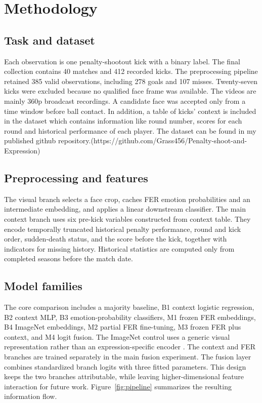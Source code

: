 \documentclass{article}
\begin{document}
\section{Methodology}

\subsection{Task and dataset}

Each observation is one penalty-shootout kick with a binary label. The final collection contains 40 matches and 412 recorded kicks. The preprocessing pipeline retained 385 valid observations, including 278 goals and 107 misses. Twenty-seven kicks were excluded because no qualified face frame was available. The videos are mainly 360p broadcast recordings. A candidate face was accepted only from a time window before ball contact. In addition, a table of kicks' context is included in the dataset which contains information like round number, scores for each round and historical performance of each player. The dataset can be found in my published github repository.(https://github.com/Grass456/Penalty-shoot-and-Expression)

\subsection{Preprocessing and features}

The visual branch selects a face crop, caches FER emotion probabilities and an intermediate embedding, and applies a linear downstream classifier. The main context branch uses six pre-kick variables constructed from context table. They encode temporally truncated historical penalty performance, round and kick order, sudden-death status, and the score before the kick, together with indicators for missing history. Historical statistics are computed only from completed seasons before the match date.

\subsection{Model families}

The core comparison includes a majority baseline, B1 context logistic regression, B2 context MLP, B3 emotion-probability classifiers, M1 frozen FER embeddings, B4 ImageNet embeddings, M2 partial FER fine-tuning, M3 frozen FER plus context, and M4 logit fusion. The ImageNet control uses a generic visual representation rather than an expression-specific encoder \citep{deng2009}. The context and FER branches are trained separately in the main fusion experiment. The fusion layer combines standardized branch logits with three fitted parameters. This design keeps the two branches attributable, while leaving higher-dimensional feature interaction for future work. Figure~\ref{fig:pipeline} summarizes the resulting information flow.
\end{document}
